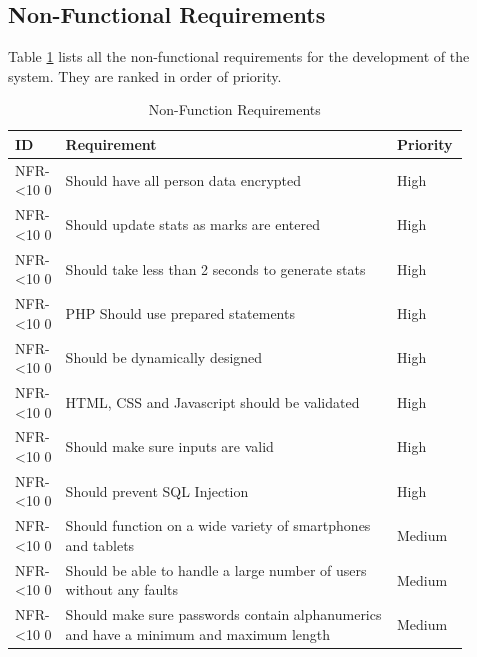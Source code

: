 \documentclass[12pt]{article}  %
\newcommand{\rid}[1]{\centering #1-\ifnum\value{requirement}<10 0\fi\arabic{requirement} \stepcounter{requirement}}
\begin{document}
\newpage
\subsection{Non-Functional Requirements}

Table \ref{table:non-func} lists all the non-functional requirements for the development of the system. They are ranked in order of priority.

\begin{spacing}{1.2}
\begin{longtable}{|p{0.1\linewidth}|p{0.7\linewidth}|p{0.1\linewidth}|}
\caption{Non-Function Requirements} \label{table:non-func}\\ 
\hline

\textbf{ID} & \textbf{Requirement} & \textbf{Priority}\\
\hline \hline


\rid{NFR} & Should have all person data encrypted & High\\ \hline

\rid{NFR} & Should update stats as marks are entered & High\\ \hline 

\rid{NFR} & Should take less than 2 seconds to generate stats  & High\\ \hline

\rid{NFR} & PHP Should use prepared statements & High\\ \hline

\rid{NFR} & Should be dynamically designed & High\\ \hline

\rid{NFR} & HTML, CSS and Javascript should be validated & High\\ \hline

\rid{NFR} & Should make sure inputs are valid & High\\ \hline

\rid{NFR} & Should prevent SQL Injection & High\\ \hline

\rid{NFR} & Should function on a wide variety of smartphones and tablets & Medium\\ \hline

\rid{NFR} & Should be able to handle a large number of users without any faults & Medium\\ \hline

\rid{NFR} & Should make sure passwords contain alphanumerics and have a minimum and maximum length  & Medium\\ \hline


\end{longtable}
\end{spacing}
\end{document}
